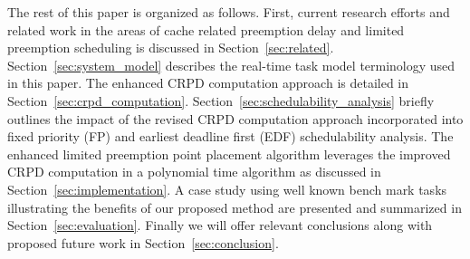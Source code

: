 The rest of this paper is organized as follows. First, current research efforts and related work in the areas of cache related preemption delay and limited preemption scheduling is discussed in Section~\ref{sec:related}.  Section~\ref{sec:system_model} describes the real-time task model terminology used in this paper.  The enhanced CRPD computation approach is detailed in Section~\ref{sec:crpd_computation}. Section~\ref{sec:schedulability_analysis} briefly outlines the impact of the revised CRPD computation approach incorporated into fixed priority (FP) and earliest deadline first (EDF) schedulability analysis.  The enhanced limited preemption point placement algorithm leverages the improved CRPD computation in a polynomial time algorithm as discussed in Section~\ref{sec:implementation}.  A case study using well known bench mark tasks illustrating the benefits of our proposed method are presented and summarized in Section~\ref{sec:evaluation}.  Finally we will offer relevant conclusions along with proposed future work in Section~\ref{sec:conclusion}. 